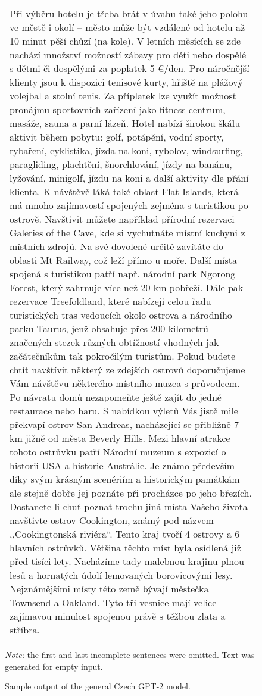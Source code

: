 \begin{figure}[htb]
        \centering
            \begin{tabular}{|l|}
\hline
\parbox{14cm}{\vspace{0.25em}Při výběru hotelu je třeba brát v úvahu také jeho polohu ve městě i okolí – město může být vzdálené od hotelu až 10 minut pěší chůzí (na kole). V letních měsících se zde nachází množství možností zábavy pro děti nebo dospělé s dětmi či dospělými za poplatek 5 €/den. Pro náročnější klienty jsou k dispozici tenisové kurty, hřiště na plážový volejbal a stolní tenis. Za příplatek lze využít možnost pronájmu sportovních zařízení jako fitness centrum, masáže, sauna a parní lázeň. Hotel nabízí širokou škálu aktivit během pobytu: golf, potápění, vodní sporty, rybaření, cyklistika, jízda na koni, rybolov, windsurfing, paragliding, plachtění, šnorchlování, jízdy na banánu, lyžování, minigolf, jízdu na koni a další aktivity dle přání klienta. K návštěvě láká také oblast Flat Islands, která má mnoho zajímavostí spojených zejména s turistikou po ostrově. Navštívit můžete například přírodní rezervaci Galeries of the Cave, kde si vychutnáte místní kuchyni z místních zdrojů. Na své dovolené určitě zavítáte do oblasti Mt Railway, což leží přímo u moře. Další místa spojená s turistikou patří např. národní park Ngorong Forest, který zahrnuje více než 20 km pobřeží. Dále pak rezervace Treefoldland, které nabízejí celou řadu turistických tras vedoucích okolo ostrova a národního parku Taurus, jenž obsahuje přes 200 kilometrů značených stezek různých obtížností vhodných jak začátečníkům tak pokročilým turistům. Pokud budete chtít navštívit některý ze zdejších ostrovů doporučujeme Vám návštěvu některého místního muzea s průvodcem. Po návratu domů nezapomeňte ještě zajít do jedné restaurace nebo baru. S nabídkou výletů Vás jistě mile překvapí ostrov San Andreas, nacházející se přibližně 7 km jižně od města Beverly Hills. Mezi hlavní atrakce tohoto ostrůvku patří Národní muzeum s expozicí o historii USA a historie Austrálie. Je známo především díky svým krásným scenériím a historickým památkám ale stejně dobře jej poznáte při procházce po jeho březích. Dostanete-li chuť poznat trochu jiná místa Vašeho života navštivte ostrov Cookington, známý pod názvem ,,Cookingtonská riviéra``. Tento kraj tvoří 4 ostrovy a 6 hlavních ostrůvků. Většina těchto míst byla osídlená již před tisíci lety. Nacházíme tady malebnou krajinu plnou lesů a hornatých údolí lemovaných borovicovými lesy. Nejznámějšími místy této země bývají městečka Townsend a Oakland. Tyto tři vesnice mají velice zajímavou minulost spojenou právě s těžbou zlata a stříbra.\vspace{0.25em}}
\\ \hline
             \end{tabular}
        \caption{Sample output of the general Czech GPT-2 model.}
	\label{fig01:gpt2GenExample}
\textit{Note:} the first and last incomplete sentences were omitted. Text was generated for empty input.
\end{figure}

